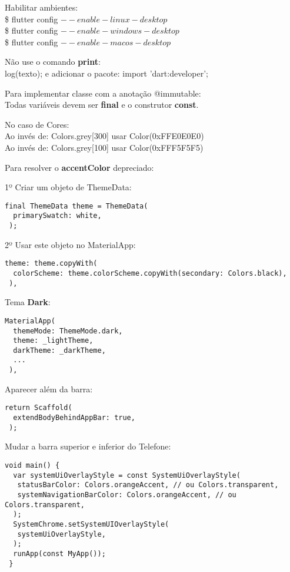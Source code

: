 \documentclass[11pt]{scrartcl}
\begin{document}
Habilitar ambientes: \\
{\ttfamily\$ flutter config $--enable-linux-desktop$} \\
{\ttfamily\$ flutter config $--enable-windows-desktop$} \\
{\ttfamily\$ flutter config $--enable-macos-desktop$}

Não use o comando \textbf{print}: \\
{\ttfamily log(texto);} e adicionar o pacote: {\ttfamily import 'dart:developer';}

Para implementar classe com a anotação @immutable: \\
Todas variáveis devem ser \textbf{final} e o construtor \textbf{const}.

No caso de Cores: \\
Ao invés de: {\ttfamily Colors.grey[300]} usar {\ttfamily Color(0xFFE0E0E0)} \\
Ao invés de: {\ttfamily Colors.grey[100]} usar {\ttfamily Color(0xFFF5F5F5)}

Para resolver o \textbf{accentColor} depreciado:

1º Criar um objeto de ThemeData:
\begin{lstlisting}[]
 final ThemeData theme = ThemeData(
  primarySwatch: white,
 );
\end{lstlisting}

2º Usar este objeto no MaterialApp:
\begin{lstlisting}[]
 theme: theme.copyWith(
  colorScheme: theme.colorScheme.copyWith(secondary: Colors.black),
 ),
\end{lstlisting}

Tema \textbf{Dark}:
\begin{lstlisting}[]
 MaterialApp(
  themeMode: ThemeMode.dark,
  theme: _lightTheme,
  darkTheme: _darkTheme,
  ...
 ),	
\end{lstlisting}

Aparecer além da barra:
\begin{lstlisting}[]
 return Scaffold(
  extendBodyBehindAppBar: true,
 ); 
\end{lstlisting}

Mudar a barra superior e inferior do Telefone:
\begin{lstlisting}[]
 void main() {
  var systemUiOverlayStyle = const SystemUiOverlayStyle(
   statusBarColor: Colors.orangeAccent, // ou Colors.transparent,
   systemNavigationBarColor: Colors.orangeAccent, // ou Colors.transparent,
  );
  SystemChrome.setSystemUIOverlayStyle(
   systemUiOverlayStyle,
  );
  runApp(const MyApp());
 }
\end{lstlisting}
\end{document}
